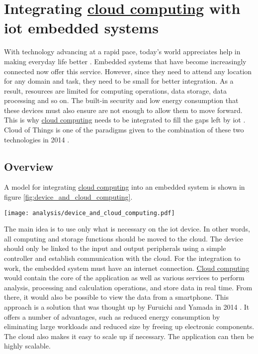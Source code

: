 \section{Integrating \texorpdfstring{\hyperref[subsec:cloudcomputing]{cloud computing}}{} with \texorpdfstring{\acrshort{iot}}{} embedded systems}

With technology advancing at a rapid pace, today's world appreciates help in making everyday life better \cite{state_of_the_art_integration_iot_cloudComputing}. Embedded systems that have become increasingly connected now offer this service. However, since they need to attend any location for any domain and task, they need to be small for better integration. As a result, resources are limited for computing operations, data storage, data processing and so on. The built-in security and low energy consumption that these devices must also ensure are not enough to allow them to move forward. This is why \hyperref[subsec:cloudcomputing]{cloud computing} needs to be integrated to fill the gaps left by \acrshort{iot} \cite{state_of_the_art_integration_iot_cloudComputing}. Cloud of Things is one of the paradigms given to the combination of these two technologies in 2014 \cite{cloud_of_thing}.

\subsection{Overview}
A model for integrating \hyperref[subsec:cloudcomputing]{cloud computing} into an embedded system is shown in figure \ref{fig:device_and_cloud_computing}. \cite{integration_embedded_systems_cloudComputing}
\begin{center}
    \begingroup
    \texttt{[image: analysis/device\_and\_cloud\_computing.pdf]}
    \label{fig:device_and_cloud_computing}
    \endgroup
\end{center}
The main idea is to use only what is necessary on the \acrshort{iot} device. In other words, all computing and storage functions should be moved to the \gls{cloud}. The device should only be linked to the input and output peripherals using a simple controller and establish communication with the \gls{cloud}. For the integration to work, the embedded system must have an internet connection. \hyperref[subsec:cloudcomputing]{Cloud computing} would contain the core of the application as well as various services to perform analysis, processing and calculation operations, and store data in real time. From there, it would also be possible to view the data from a smartphone. This approach is a solution that was thought up by Furuichi and Yamada in 2014 \cite{next_generation_iot_cloud}. It offers a number of advantages, such as reduced energy consumption by eliminating large workloads and reduced size by freeing up electronic components. The \gls{cloud} also makes it easy to scale up if necessary. The application can then be highly scalable. \cite{integration_embedded_systems_cloudComputing}

